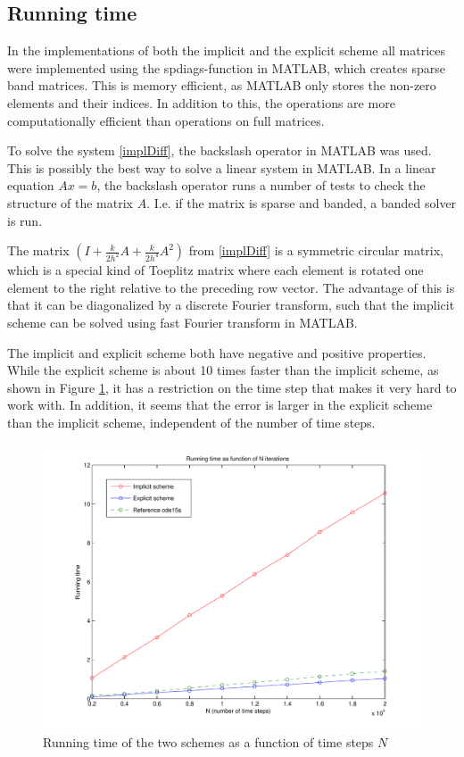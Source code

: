 \subsection{Running time}
In the implementations of both the implicit and the explicit scheme all matrices were implemented using the spdiags-function in MATLAB, which creates sparse band matrices. This is memory efficient, as MATLAB only stores the non-zero elements and their indices. In addition to this, the operations are more computationally efficient than operations on full matrices. \cite{sparse}

To solve the system \eqref{implDiff}, the backslash operator in MATLAB was used. This is possibly the best way to solve a linear system in MATLAB.  In a linear equation $Ax = b$, the backslash operator runs a number of tests to check the structure of the matrix $A$. I.e. if the matrix is sparse and banded, a banded solver is run.

The matrix $\left( I + \frac{k}{2h^2}A + \frac{k}{2h^4}A^2\right)$ from \eqref{implDiff} is a symmetric circular matrix, which is a special kind of Toeplitz matrix where each element is rotated one element to the right relative to the preceding row vector. The advantage of this is that it can be diagonalized by a discrete Fourier transform, such that the implicit scheme can be solved using fast Fourier transform in MATLAB.

The implicit and explicit scheme both have negative and positive properties. While the explicit scheme is about 10 times faster than the implicit scheme, as shown in Figure \ref{fig:runTime}, it has a restriction on the time step that makes it very hard to work with. In addition, it seems that the error is larger in the explicit scheme than the implicit scheme, independent of the number of time steps.

\begin{figure}[H]
\centering
\includegraphics[scale=0.4]
{../PDFs/Comparisons/running_time3.pdf}
\caption{Running time of the two schemes as a function of time steps $N$}
\label{fig:runTime}
\end{figure}

